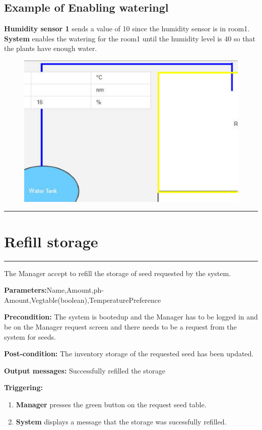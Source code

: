 \subsection{Example of Enabling wateringl}
\textbf{Humidity sensor 1} sends a value of 10 since the humidity sensor is in
room1.
\textbf{System} enables the watering for the room1 until the humidity level is
40 so that the plants have enough water.
\item \begin{figure}[H]
\includegraphics[width=1\textwidth]{images/WateringOn.eps}
\end{figure}
\hfill
\vspace{0.5cm}
\hrule


\break

\section{Refill storage}

\hrule
\hfill
\vspace{0.5cm}

\label{operation:Refill storage System request}

The Manager accept to refill the storage of seed requested by the system.
\begin{description}
\item
\textbf{Parameters:}Name,Amount,ph-Amount,Vegtable(boolean),TemperaturePreference
\item \textbf{Precondition:} The system is bootedup and the Manager has to be
logged in and be on the Manager request screen and there needs to be a request
from the system for seeds.
\item \textbf{Post-condition:} The inventory storage of the requested seed has
been updated.
\item 
\item \item \textbf{Output messages:} Successfully refilled the storage
\item \textbf{Triggering:}
\begin{enumerate}
\item \textbf{Manager} presses the green button on the request seed table.
\item \textbf{System} displays a message that the storage was sucessfully
refilled.
\end{enumerate}
\end{description}

